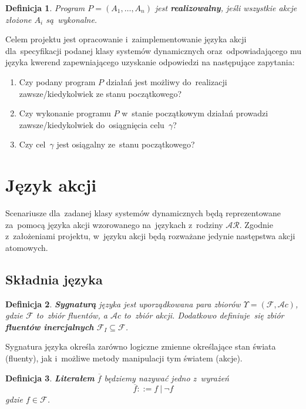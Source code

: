 \documentclass[11pt,a4paper]{article}
\newtheorem{defn}{Definicja}
\begin{document}
\begin{defn}
    Program $P = (A_1, \dots, A_n)$ jest \textbf{realizowalny}, jeśli wszystkie akcje złożone $A_i$ są~wykonalne.
\end{defn}

Celem projektu jest opracowanie i~zaimplementowanie języka akcji dla~specyfikacji podanej klasy systemów dynamicznych oraz~odpowiadającego mu języka kwerend zapewniającego uzyskanie odpowiedzi na następujące zapytania:

\begin{enumerate}
    \item Czy podany program $P$ działań jest możliwy do~realizacji zawsze/kiedykolwiek ze stanu początkowego?
    \item Czy wykonanie programu $P$ w~stanie początkowym działań prowadzi zawsze/kiedykolwiek do~osiągnięcia celu~$\gamma$?
    \item Czy cel~$\gamma$ jest osiągalny ze~stanu początkowego?
\end{enumerate}

\section{Język akcji}

Scenariusze dla~zadanej klasy systemów dynamicznych będą reprezentowane za~pomocą języka akcji wzorowanego na~językach z~rodziny $\mathcal{AR}$.
Zgodnie z~założeniami projektu, w~języku akcji będą rozważane jedynie następstwa akcji atomowych.

\subsection{Składnia języka}

\begin{defn}
    \textbf{Sygnaturą} języka jest uporządkowana para zbiorów $\Upsilon = (\mathcal{F}, \mathcal{A}c)$, gdzie $\mathcal{F}$ to~zbiór fluentów, a $ \mathcal{A}c$ to~zbiór akcji.
    Dodatkowo definiuje~się zbiór \textbf{fluentów inercjalnych} $\mathcal{F}_I \subseteq \mathcal{F}$.
\end{defn}

Sygnatura języka określa zarówno logiczne zmienne określające stan świata (fluenty), jak i~możliwe metody manipulacji tym światem (akcje).

\begin{defn}
    \textbf{Literałem} $\overline{f}$ będziemy nazywać jedno z~wyrażeń
    $$ \overline{f} ::= f\ |\ \neg f $$
    gdzie $f \in \mathcal{F}$.
\end{defn}
\end{document}
